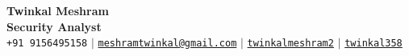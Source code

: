\documentclass[letterpaper,11pt]{article}
\begin{document}
\begin{center}
    \textbf{\Huge Twinkal Meshram} \\[6pt]
    \textbf{\Large Security Analyst} \\[10pt]
   
    \small
    \faPhone*\hspace{4pt}\texttt{+91 9156495158} \quad $|$\quad
    \href{mailto:meshramtwinkal@gmail.com}{\faEnvelope\hspace{6pt}\texttt{meshramtwinkal@gmail.com}} \quad $|$\quad
    \href{https://www.linkedin.com/in/twinkalmeshram2}{\faLinkedin\hspace{6pt}\texttt{twinkalmeshram2}} \quad $|$\quad
    \href{https://github.com/twinkal358}{\faGithub\hspace{6pt}\texttt{twinkal358}}
   
    \vspace{6pt}
\end{center}

\end{document}
